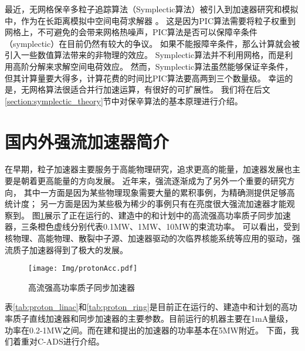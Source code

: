 最近，无网格保辛多粒子追踪算法（Symplectic算法）被引入到加速器研究和模拟中，作为在长距离模拟中空间电荷求解器 \cite{symplectic_ji2017}。
这是因为PIC算法需要将粒子权重到网格上，不可避免的会带来网格热噪声，PIC算法是否可以保障辛条件（symplectic）在目前仍然有较大的争议。
如果不能报障辛条件，那么计算就会被引入一些数值算法带来的非物理的效应。
Symplectic算法并不利用网格，而是利用高阶分解来求解空间电荷效应。
然而，Symplectic算法虽然能够保证辛条件，但其计算量要大得多，计算花费的时间比PIC算法要高两到三个数量级。
幸运的是，无网格算法很适合并行加速运算，有很好的可扩展性。
我们将在后文\ref{section:symplectic_theory}节中对保辛算法的基本原理进行介绍。

\section{国内外强流加速器简介}

在早期，粒子加速器主要服务于高能物理研究，追求更高的能量，加速器发展也主要是朝着更高能量的方向发展。
近年来，强流逐渐成为了另外一个重要的研究方向，
其中一方面是因为某些物理现象需要大量的累积事例，为精确测提供足够高统计度；
另一方面是因为某些极为稀少的事例只有在亮度很大强流加速器才能观察到。
图\ref{fig:proton_ring}展示了正在运行的、建造中的和计划中的高流强高功率质子同步加速器，三条橙色虚线分别代表0.1MW、1MW、10MW的束流功率。
可以看出，受到核物理、高能物理、散裂中子源、加速器驱动的次临界核能系统等应用的驱动，强流质子加速器得到了极大的发展。
\begin{figure}[!htb]
    \centering
    \texttt{[image: Img/protonAcc.pdf]}
    \caption{高流强高功率质子同步加速器}
    \label{fig:proton_ring}
\end{figure}

表\ref{tab:proton_linac}和\ref{tab:proton_ring}是目前正在运行的、建造中和计划的高功率质子直线加速器和同步加速器的主要参数\cite{tang2011proton}。目前运行的机器主要在1mA量级，功率在0.2-1MW之间。而在建和提出的加速器的功率基本在5MW附近。
下面，我们着重对C-ADS进行介绍。

